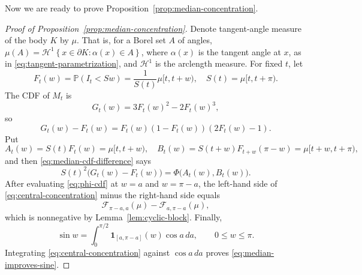 \documentclass[final,12pt]{elsarticle}
\numberwithin{equation}{section}
\theoremstyle{remark}
\theoremstyle{definition}
\begin{document}
Now we are ready to prove Proposition~\ref{prop:median-concentration}.
\begin{proof}[Proof of Proposition~\ref{prop:median-concentration}]
Denote tangent-angle measure of the body $K$ by $\mu$. That is, for a Borel set \(A\) of angles,
$\mu(A)=\mathcal H^1\left\{x\in \partial K: \alpha(x) \in A\right\}$, where $\alpha(x)$ is the tangent angle at $x$, as in \ref{eq:tangent-parametrization}, and $\mathcal H^1$ is the arclength measure. For fixed $t$, let
$$
    F_t(w)=\mathbb P(I_t<S w) = \frac{1}{S(t)}\mu[t,t+w),\quad S(t)=\mu[t,t+\pi).
$$
The CDF of $M_t$ is
$$
    G_t(w)=3F_t(w)^2-2F_t(w)^3,
$$
so
\begin{equation}\label{eq:median-cdf-difference}
    G_t(w)-F_t(w)
    =F_t(w)(1-F_t(w))(2F_t(w)-1).
\end{equation}
Put
$$
    A_t(w)=S(t)F_t(w)=\mu[t,t+w),
    \quad
    B_t(w)=S(t+w)F_{t+w}(\pi-w)=\mu[t+w, t+\pi),
$$
and then \eqref{eq:median-cdf-difference} says
\begin{equation}\label{eq:phi-cdf}
    S(t)^2\bigl(G_t(w)-F_t(w)\bigr)
    =\Phi\bigl(A_t(w),B_t(w)\bigr).
\end{equation}
After evaluating \eqref{eq:phi-cdf} at $w=a$ and $w=\pi-a$, the left-hand side of
\eqref{eq:central-concentration} minus the right-hand side equals
$$
    \mathcal F_{\pi-a,a}(\mu)-\mathcal F_{a,\pi-a}(\mu),
$$
which is nonnegative by Lemma~\ref{lem:cyclic-block}.  Finally,
\begin{equation}\label{eq:sine-layer-cake}
    \sin w=\int_0^{\pi/2}
       \mathbf 1_{[a,\pi-a]}(w)\cos a\,da,
    \qquad 0\le w\le\pi.
\end{equation}
Integrating \eqref{eq:central-concentration} against $\cos a\,da$ proves
\eqref{eq:median-improves-sine}.
\end{proof}
\end{document}
